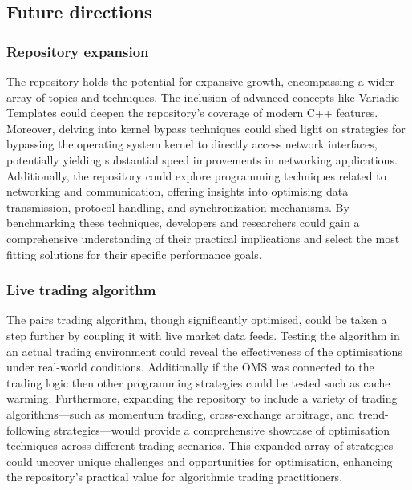 \documentclass{article}
\theoremstyle{break}
\begin{document}
\subsection*{Future directions}

\subsubsection*{Repository expansion}
The repository holds the potential for expansive growth, encompassing a wider array of topics and techniques. The inclusion of advanced concepts like Variadic Templates could deepen the repository's coverage of modern C++ features. Moreover, delving into kernel bypass techniques could shed light on strategies for bypassing the operating system kernel to directly access network interfaces, potentially yielding substantial speed improvements in networking applications. Additionally, the repository could explore programming techniques related to networking and communication, offering insights into optimising data transmission, protocol handling, and synchronization mechanisms. By benchmarking these techniques, developers and researchers could gain a comprehensive understanding of their practical implications and select the most fitting solutions for their specific performance goals.


\subsubsection*{Live trading algorithm}
The pairs trading algorithm, though significantly optimised, could be taken a step further by coupling it with live market data feeds. Testing the algorithm in an actual trading environment could reveal the effectiveness of the optimisations under real-world conditions. Additionally if the OMS was connected to the trading logic then other programming strategies could be tested such as cache warming. Furthermore, expanding the repository to include a variety of trading algorithms—such as momentum trading, cross-exchange arbitrage, and trend-following strategies—would provide a comprehensive showcase of optimisation techniques across different trading scenarios. This expanded array of strategies could uncover unique challenges and opportunities for optimisation, enhancing the repository's practical value for algorithmic trading practitioners. 
\end{document}
